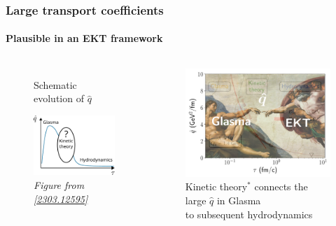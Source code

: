 \documentclass[aspectratio=169,11pt,usenames,dvipsnames]{beamer}
\begin{document}
\begin{frame}[noframenumbering]
    \frametitle{Large transport coefficients}
    \framesubtitle{Plausible in an EKT framework}
    \vspace{-0.4cm}
    \begin{columns}[onlytextwidth,t]
        \begin{figure}[!hbt]
            \centering
            \captionsetup{justification=centering}
            \caption{Schematic evolution of $\hat{q}$}\vspace{-0.3cm}
            \includegraphics[width=0.78\columnwidth]{images/qhat_schematic_evolution.pdf}\vspace{-0.3cm}
            \caption{\scriptsize\itshape Figure from \href{https://arxiv.org/abs/2303.12595}{\color{ForestGreen}[2303.12595]}}
        \end{figure}
        \begin{figure}[!hbt]
            \centering
            \captionsetup{justification=centering}
            \caption{{\color{ForestGreen}Kinetic theory}$^*$ connects the large $\hat{q}$ in {\color{Dandelion}Glasma}\\ to subsequent {\color{Periwinkle}hydrodynamics}}\vspace{-0.2cm}
            \includegraphics[width=0.8\columnwidth]{images/qhat_whole.png}
        \end{figure}
    \end{columns}   
\end{frame}
\end{document}
